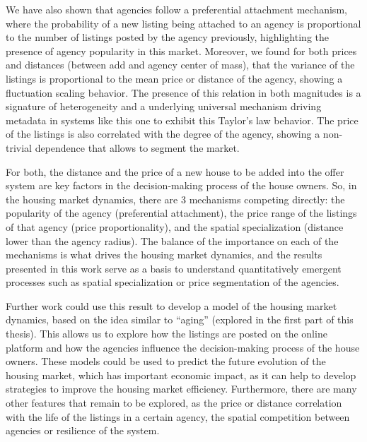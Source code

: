 We have also shown that agencies follow a preferential attachment mechanism, where the probability of a new listing being attached to an agency is proportional to the number of listings posted by the agency previously, highlighting the presence of agency popularity in this market. Moreover, we found for both prices and distances (between add and agency center of mass), that the variance of the listings is proportional to the mean price or distance of the agency, showing a fluctuation scaling behavior. The presence of this relation in both magnitudes is a signature of heterogeneity and a underlying universal mechanism driving metadata in systems like this one to exhibit this Taylor's law behavior. The price of the listings is also correlated with the degree of the agency, showing a non-trivial dependence that allows to segment the market. 

For both, the distance and the price of a new house to be added into the offer system are key factors in the decision-making process of the house owners. So, in the housing market dynamics, there are 3 mechanisms competing directly: the popularity of the agency (preferential attachment), the price range of the listings of that agency (price proportionality), and the spatial specialization (distance lower than the agency radius). The balance of the importance on each of the mechanisms is what drives the housing market dynamics, and the results presented in this work serve as a basis to understand quantitatively emergent processes such as spatial specialization or price segmentation of the agencies.

Further work could use this result to develop a model of the housing market dynamics, based on the idea similar to ``aging'' (explored in the first part of this thesis). This allows us to explore how the listings are posted on the online platform and how the agencies influence the decision-making process of the house owners. These models could be used to predict the future evolution of the housing market, which has important economic impact, as it can help to develop strategies to improve the housing market efficiency. Furthermore, there are many other features that remain to be explored, as the price or distance correlation with the life of the listings in a certain agency, the spatial competition between agencies or resilience of the system.